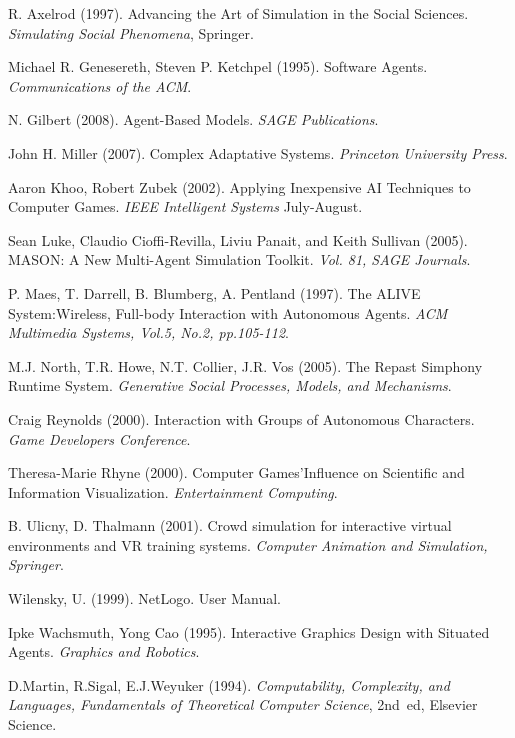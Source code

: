 \documentclass[a4paper,twoside]{article}
\begin{document}
\renewcommand{\baselinestretch}{0.98}

{\small

\begin{thebibliography}{14}

R. Axelrod (1997).
Advancing the Art of Simulation in the Social Sciences.
\emph{Simulating Social Phenomena}, Springer.

Michael R. Genesereth, Steven P. Ketchpel (1995).
\newblock Software Agents.
\newblock \emph{Communications of the ACM}.

N. Gilbert (2008).
\newblock Agent-Based Models.
\newblock \emph{SAGE Publications}.

John H. Miller (2007).
\newblock Complex Adaptative Systems.
\newblock \emph{Princeton University Press}.

Aaron Khoo, Robert Zubek (2002).
\newblock Applying Inexpensive AI Techniques to Computer Games.
\newblock \emph{IEEE Intelligent Systems} July-August.

Sean Luke, Claudio Cioffi-Revilla, Liviu Panait, and Keith Sullivan (2005).
\newblock MASON: A New Multi-Agent Simulation Toolkit.
\newblock \emph{Vol. 81, SAGE Journals}.

P. Maes, T. Darrell, B. Blumberg, A. Pentland (1997).
\newblock The ALIVE System:Wireless, Full-body Interaction with Autonomous Agents.
\newblock \emph{ACM Multimedia Systems, Vol.5, No.2, pp.105-112}.

M.J. North, T.R. Howe, N.T. Collier, J.R. Vos (2005).
\newblock The Repast Simphony Runtime System.
\newblock \emph{Generative Social Processes, Models, and Mechanisms}.

Craig Reynolds (2000).
\newblock Interaction with Groups of Autonomous Characters.
\newblock \emph{Game Developers Conference}.

Theresa-Marie Rhyne (2000).
\newblock Computer Games’Influence on Scientific and Information Visualization.
\newblock \emph{Entertainment Computing}.

B. Ulicny, D. Thalmann (2001).
\newblock Crowd simulation for interactive virtual environments and VR training systems.
\newblock \emph{Computer Animation and Simulation, Springer}.

Wilensky, U. (1999).
\newblock NetLogo. User Manual.

Ipke Wachsmuth, Yong Cao (1995).
\newblock Interactive Graphics Design with Situated Agents.
\newblock \emph{Graphics and Robotics}.

D.Martin, R.Sigal, E.J.Weyuker (1994).
\emph{Computability, Complexity, and Languages, Fundamentals of Theoretical Computer Science},
2nd~ed, Elsevier Science.

\end{thebibliography}

}
\renewcommand{\baselinestretch}{1}






\end{document}
